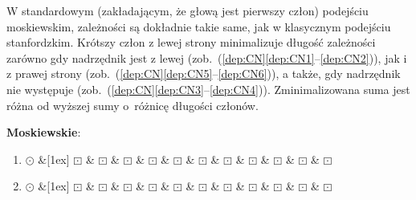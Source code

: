 \documentclass[licencjacka]{pracamgr_Kogni}
\begin{document}
    W standardowym (zakładającym, że głową jest pierwszy człon) podejściu moskiewskim, zależności są dokładnie takie same, jak w klasycznym podejściu stanfordzkim.
    Krótszy człon z lewej strony minimalizuje długość zależności zarówno gdy nadrzędnik jest z lewej (zob.~(\ref{dep:CN}\ref{dep:CN1}--\ref{dep:CN2})), jak i z prawej strony (zob.~(\ref{dep:CN}\ref{dep:CN5}--\ref{dep:CN6})), a także, gdy nadrzędnik nie występuje (zob.~(\ref{dep:CN}\ref{dep:CN3}--\ref{dep:CN4})). 
    Zminimalizowana suma jest różna od wyższej sumy o~różnicę długości członów.
    \begin{exe}
        \item\label{dep:CN} \textbf{Moskiewskie}:
        \begin{enumerate}[label=\alph{enumi}. , ref=\alph{enumi}]
            \item 
                \hspace{-1em}\begin{dependency}[baseline=-3pt, hide label, edge height=.5em]
                \begin{deptext}[column sep=.1ex]
                    $\odot$  \&[1ex] $\boxdot$ \& $\boxdot$ \& $\boxdot$ \& $\boxdot$ \& $\boxdot$ \& $\boxdot$ \& $\boxdot$ \& $\boxdot$ \& $\boxdot$ \& $\boxdot$ \& $\boxdot$\\
                \end{deptext}
                \end{dependency}
                \label{dep:CN1}
            \item 
                \hspace{-1em}\begin{dependency}[baseline=-3pt, hide label, edge height=.5em]
                \begin{deptext}[column sep=.1ex]
                    $\odot$  \&[1ex] $\boxdot$ \& $\boxdot$ \& $\boxdot$ \& $\boxdot$ \& $\boxdot$ \& $\boxdot$ \& $\boxdot$ \& $\boxdot$ \& $\boxdot$ \& $\boxdot$ \& $\boxdot$\\
                \end{deptext}
                \end{dependency}

\end{enumerate}
\end{exe}
\end{document}
